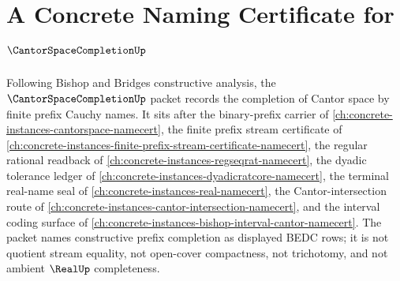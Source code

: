 \chapter{A Concrete Naming Certificate for $\CantorSpaceCompletionUp$}
\label{ch:concrete-instances-cantor-space-completion-namecert}

Following Bishop and Bridges constructive analysis, the $\CantorSpaceCompletionUp$ packet records the completion of Cantor space by finite prefix Cauchy names. It sits after the binary-prefix carrier of \autoref{ch:concrete-instances-cantorspace-namecert}, the finite prefix stream certificate of \autoref{ch:concrete-instances-finite-prefix-stream-certificate-namecert}, the regular rational readback of \autoref{ch:concrete-instances-regseqrat-namecert}, the dyadic tolerance ledger of \autoref{ch:concrete-instances-dyadicratcore-namecert}, the terminal real-name seal of \autoref{ch:concrete-instances-real-namecert}, the Cantor-intersection route of \autoref{ch:concrete-instances-cantor-intersection-namecert}, and the interval coding surface of \autoref{ch:concrete-instances-bishop-interval-cantor-namecert}. The packet names constructive prefix completion as displayed BEDC rows; it is not quotient stream equality, not open-cover compactness, not trichotomy, and not ambient $\RealUp$ completeness.

